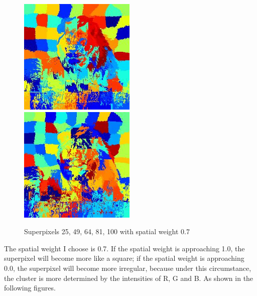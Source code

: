 \documentclass{article}
\begin{document}
\begin{figure}[h!]
	\includegraphics[height=15em]{code/outputs/prob1b_spatial_weight_0.7/prob1b_81.jpg}
	\includegraphics[height=15em]{code/outputs/prob1b_spatial_weight_0.7/prob1b_100.jpg}
	\caption{Superpixels 25, 49, 64, 81, 100 with spatial weight 0.7}
\end{figure}

The spatial weight I choose is 0.7. If the spatial weight is approaching 1.0, the superpixel will become more like a square; if the spatial weight is approaching 0.0, the superpixel will become more irregular, because under this circumstance, the cluster is more determined by the intensities of R, G and B. As shown in the following figures.
\end{document}
